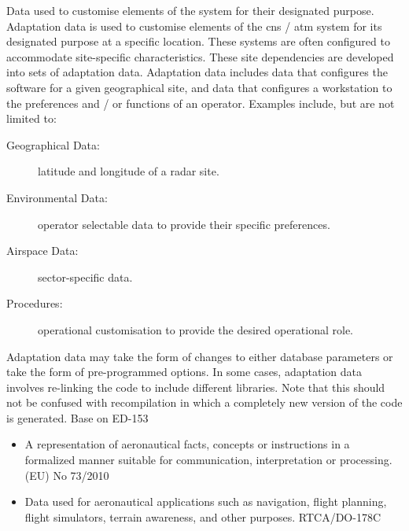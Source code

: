 %
	{Data used to customise elements of the system for their designated purpose.
		Adaptation data is used to customise elements of the \gls{cns} / \gls{atm} system for its designated purpose at a specific location.
		These systems are often configured to accommodate site-specific characteristics.
		These site dependencies are developed into sets of adaptation data.
		Adaptation data includes data that configures the software for a given geographical site, and data that configures a workstation to the preferences and / or functions of an operator.
		Examples include, but are not limited to:
		\begin{description}
			\item[Geographical Data:] latitude and longitude of a radar site.
			\item[Environmental Data:] operator selectable data to provide their specific preferences.
			\item[Airspace Data:] sector-specific data.
			\item[Procedures:] operational customisation to provide the desired operational role.
		\end{description}
		Adaptation data may take the form of changes to either database parameters or take the form of pre-programmed options.
		In some cases, adaptation data involves re-linking the code to include different libraries.
		Note that this should not be confused with recompilation in which a completely new version of the code is generated. Base on ED-153 \cite{citation:ED153}}

%
	{\begin{itemize}
	\item A representation of aeronautical facts, concepts or instructions in a formalized manner suitable for communication, interpretation or processing. (EU) No 73/2010 \cite{citation:EU732010}
	\item Data used for aeronautical applications such as navigation, flight planning, flight simulators, terrain awareness, and other purposes. RTCA/DO-178C \cite{citation:ED12C}
	\end{itemize}}

